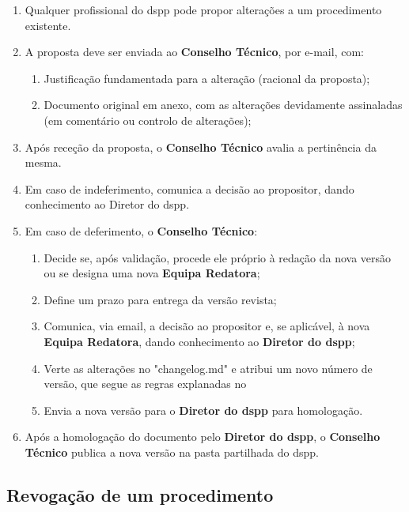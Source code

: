 \begin{enumerate}
  \item Qualquer profissional do \gls{dspp} pode propor alterações a um procedimento existente.
  \item A proposta deve ser enviada ao \textbf{Conselho Técnico}, por e-mail, com:
  \begin{enumerate}
    \item Justificação fundamentada para a alteração (racional da proposta);
    \item Documento original em anexo, com as alterações devidamente assinaladas (em comentário ou controlo de alterações);
  \end{enumerate}
  \item Após receção da proposta, o \textbf{Conselho Técnico} avalia a pertinência da mesma.
  \item Em caso de indeferimento, comunica a decisão ao propositor, dando conhecimento ao Diretor do \gls{dspp}.
  \item Em caso de deferimento, o \textbf{Conselho Técnico}:
  \begin{enumerate}
    \item Decide se, após validação, procede ele próprio à redação da nova versão ou se designa uma nova \textbf{Equipa Redatora};
    \item Define um prazo para entrega da versão revista;
    \item Comunica, via email, a decisão ao propositor e, se aplicável, à nova \textbf{Equipa Redatora}, dando conhecimento ao \textbf{Diretor do \gls{dspp}};
    \item Verte as alterações no "changelog.md" e atribui um novo número de versão, que segue as regras explanadas no 
    \item Envia a nova versão para o \textbf{Diretor do \gls{dspp}} para homologação.
  \end{enumerate}
  \item Após a homologação do documento pelo \textbf{Diretor do \gls{dspp}}, o \textbf{Conselho Técnico} publica a nova versão na pasta partilhada do \gls{dspp}.
\end{enumerate}


\subsection*{Revogação de um procedimento}

